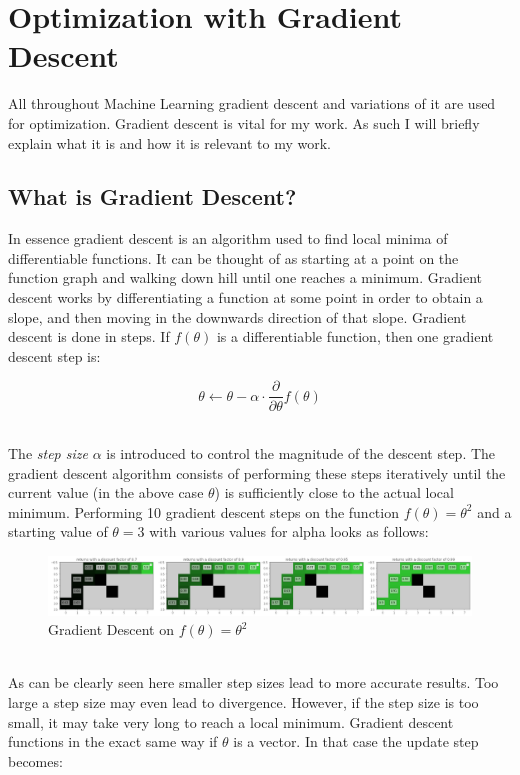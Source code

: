 \section{Optimization with Gradient Descent}\label{gd}
All throughout Machine Learning gradient descent and variations of it are used for optimization. Gradient descent is vital for my work. As such I will briefly explain what it is and how it is relevant to my work.

\subsection{What is Gradient Descent?}\label{gd:what_is_it}
In essence gradient descent is an algorithm used to find local minima of differentiable functions. It can be thought of as starting at a point on the function graph and walking down hill until one reaches a minimum. Gradient descent works by differentiating a function at some point in order to obtain a slope, and then moving in the downwards direction of that slope. Gradient descent is done in steps. If $f(\theta)$ is a differentiable function, then one gradient descent step is:

\begin{equation}\label{Graident_Descent:basic_update}
    \theta \leftarrow \theta - \alpha \cdot \frac{\partial}{\partial \theta}f(\theta)
\end{equation}

\noindent
\\ The \textit{step size} $\alpha$ is introduced to control the magnitude of the descent step. The gradient descent algorithm consists of performing these steps iteratively until the current value (in the above case $\theta$) is sufficiently close to the actual local minimum. Performing 10 gradient descent steps on the function $f(\theta) = \theta^2$ and a starting value of $\theta = 3$ with various values for alpha looks as follows:

\begin{figure}[ht]
    \centering
    \includegraphics[width=\linewidth]{figures/grid_world_discount_factors.png}
    \caption{Gradient Descent on $f(\theta) = \theta^2$}
    \label{fig:UNO}
\end{figure}

\noindent
\\ As can be clearly seen here smaller step sizes lead to more accurate results. Too large a step size may even lead to divergence. However, if the step size is too small, it may take very long to reach a local minimum. Gradient descent functions in the exact same way if $\theta$ is a vector. In that case the update step becomes:


